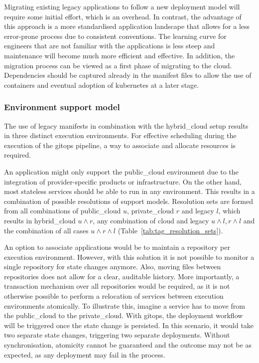 \documentclass[../main.tex]{subfiles}
\begin{document}
    

    Migrating existing legacy applications to follow a new deployment model will require some initial effort, which is an overhead.
    In contrast, the advantage of this approach is a more standardised application landscape that allows for a less error-prone process due to consistent conventions.
    The learning curve for engineers that are not familiar with the applications is less steep and maintenance will become much more efficient and effective.
    In addition, the migration process can be viewed as a first phase of migrating to the \gls{cloud}.
    Dependencies should be captured already in the manifest files to allow the use of containers and eventual adoption of \gls{kubernetes} at a later stage.

    \subsubsection{Environment support model}

    The use of legacy manifests in combination with the \gls{hybrid_cloud} setup results in three distinct execution environments.
    For effective scheduling during the execution of the \gls{gitops} pipeline, a way to associate and allocate resources is required.

    An application might only support the \gls{public_cloud} environment due to the integration of provider-specific products or infrastructure.
    On the other hand, most stateless services should be able to run in any environment.
    This results in a combination of possible resolutions of support models.
    Resolution sets are formed from all combinations of \gls{public_cloud} $u$, \gls{private_cloud} $r$ and legacy $l$, which results in \gls{hybrid_cloud} $u\land r$, any combination of \gls{cloud} and legacy $u\land l, r\land l$ and the combination of all cases $u\land r\land l$ (Table~\ref{tab:tag_resolution_sets}).

    

    An option to associate applications would be to maintain a repository per execution environment.
    However, with this solution it is not possible to monitor a single repository for state changes anymore.
    Also, moving files between repositories does not allow for a clear, auditable history.
    More importantly, a transaction mechanism over all repositories would be required, as it is not otherwise possible to perform a relocation of services between execution environments atomically.
    To illustrate this, imagine a service has to move from the \gls{public_cloud} to the \gls{private_cloud}.
    With \gls{gitops}, the deployment workflow will be triggered once the state change is persisted.
    In this scenario, it would take two separate state changes, triggering two separate deployments.
    Without synchronisation, atomicity cannot be guaranteed and the outcome may not be as expected, as any deployment may fail in the process.
\end{document}
